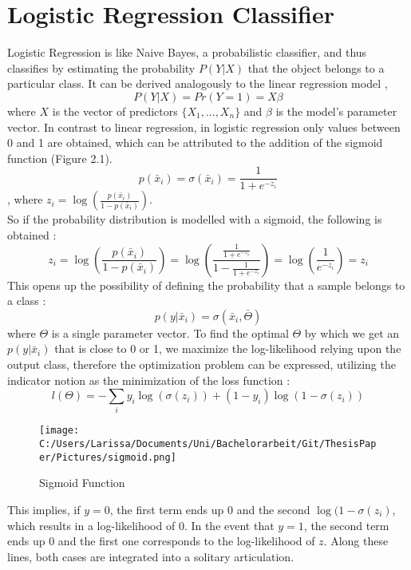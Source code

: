 \documentclass[a4paper, 11pt,titlepage,oneside,openany]{book}
\begin{document}
\section{Logistic Regression Classifier}
\noindent Logistic Regression is like Naive Bayes, a probabilistic classifier, and thus classifies by estimating the probability $P(Y|X)$ that the object belongs to a particular class.
It can be derived analogously to the linear regression model \cite{logisticregressionbook}, 
\[
P(Y|X)=Pr(Y=1)=X\beta
\]
where $X$ is the vector of predictors $\{X_1,...,X_n\}$ and $\beta$ is the model's parameter vector. In contrast to linear regression, in logistic regression only values between 0 and 1 are obtained, which can be attributed to the addition of the sigmoid function \cite{algorithms2} (Figure 2.1).
\[
p(\bar{x}_i)=\sigma(\bar{x}_i)=\frac{1}{1+e^{-z_i}}
\]
, where $z_i=\log(\frac{p(\bar{x}_i)}{1-p(\bar{x}_i)})$. \\
So if the probability distribution is modelled with a sigmoid, the following is obtained \cite{algorithms2}:
\[
z_i=\log(\frac{p(\bar{x}_i)}{1-p(\bar{x}_i)})=\log(\frac{\frac{1}{1+e^{-z_i}}}{1-\frac{1}{1+e^{-z_i}}})=\log(\frac{1}{e^{-z_i}})=z_i
\]
This opens up the possibility of defining the probability that a sample belongs to a class \cite{algorithms2}:
\[
p(y|\bar{x}_i)=\sigma(\bar{x}_i,\bar{\Theta})
\]
where $\Theta$ is a single parameter vector.
\noindent To find the optimal $\Theta$ by which we get an $p(y|\bar{x}_i)$ that is close to 0 or 1, we maximize the log-likelihood relying upon the output class, therefore the optimization problem can be expressed, utilizing the indicator notion as the minimization of the loss function \cite{algorithms}:
\[
l(\Theta)=-\sum_{i}y_i\log(\sigma(z_i))+(1-y_i)\log(1-\sigma(z_i))
\]
\begin{figure}[t]
	\centering
	\texttt{[image: C:/Users/Larissa/Documents/Uni/Bachelorarbeit/Git/ThesisPaper/Pictures/sigmoid.png]}
	\caption{Sigmoid Function \cite{algorithms}}
\end{figure}
\noindent This implies, if $y=0$, the first term ends up $0$ and the second $\log(1-\sigma(z_i)$, which results in a log-likelihood of $0$. In the event that $y=1$, the second term ends up 0 and the first one corresponds to the log-likelihood of $z$. Along these lines, both cases are integrated into a solitary articulation. \\
\end{document}
